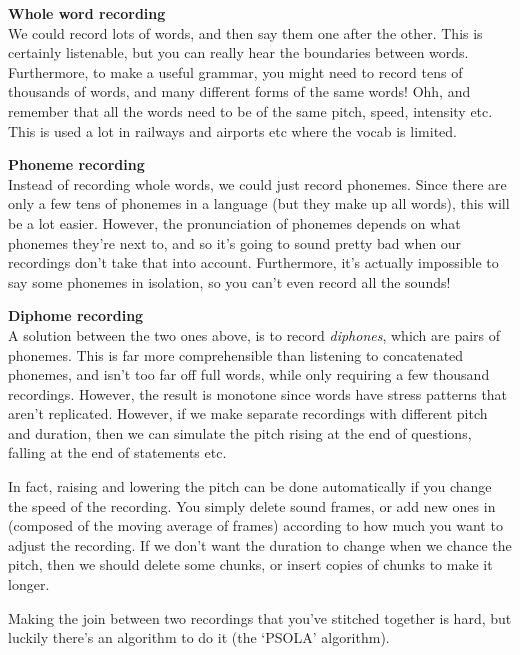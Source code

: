 \begin{description}
  \item \textbf{Whole word recording}\\
  We could record lots of words, and then say them one after  the other. This is
  certainly listenable, but you can really hear the  boundaries between words.
  Furthermore, to make a useful grammar, you might  need to record tens of
  thousands of words, and many different forms of the  same words! Ohh, and
  remember that all the words need to be of the same pitch,  speed, intensity
  etc. This is used a lot in railways and airports etc where  the vocab is
  limited.

  \item \textbf{Phoneme recording}\\
  Instead of recording whole words, we could just record phonemes. Since there
  are only a few tens of phonemes in a language (but they make up all words),
  this will be a lot easier. However, the pronunciation of phonemes depends on
  what phonemes they're next to, and so it's going to sound pretty bad when our
  recordings don't take that into account. Furthermore, it's actually impossible
  to say some phonemes in isolation, so you can't even record all the sounds!

  \item \textbf{Diphome recording}\\
  A solution between the two ones above, is to record \textit{diphones}, which
  are pairs of phonemes. This is far more comprehensible than listening to
  concatenated phonemes, and isn't too far off full words, while only requiring
  a few thousand recordings. However, the result is monotone since words have
  stress patterns that aren't replicated. However, if we make separate
  recordings with different pitch and duration, then we can simulate the pitch
  rising at the end of questions, falling at the end of statements etc.

  In fact, raising and lowering the pitch can be done automatically if you
  change the speed of the recording. You simply delete sound frames, or add new
  ones in (composed of the moving average of frames) according to how much you
  want to adjust the recording. If we don't want the duration to change when we
  chance the pitch, then we should delete some chunks, or insert copies of
  chunks to make it longer.
\end{description}

Making the join between two recordings that you've stitched together is hard,
but luckily there's an algorithm to do it (the `PSOLA' algorithm).


